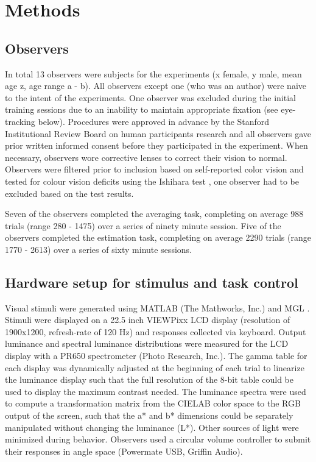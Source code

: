 \section{Methods}

\subsection{Observers}
In total 13 observers were subjects for the experiments (x female, y male, mean age z, age range a - b). All observers except one (who was an author) were naive to the intent of the experiments. One observer was excluded during the initial training sessions due to an inability to maintain appropriate fixation (see eye-tracking below). Procedures were approved in advance by the Stanford Institutional Review Board on human participants research and all observers gave prior written informed consent before they participated in the experiment. When necessary, observers wore corrective lenses to correct their vision to normal. Observers were filtered prior to inclusion based on self-reported color vision and tested for colour vision deficits using the Ishihara test \citep{Ishihara1987-wo}, one observer had to be excluded based on the test results.

Seven of the observers completed the averaging task, completing on average 988 trials (range 280 - 1475) over a series of ninety minute session. Five of the observers completed the estimation task, completing on average 2290 trials (range 1770 - 2613) over a series of sixty minute sessions. 

\subsection{Hardware setup for stimulus and task control}

Visual stimuli were generated using MATLAB (The Mathworks, Inc.) and MGL \citep{Gardner2018-uq}. Stimuli were displayed on a 22.5 inch VIEWPixx LCD display (resolution of 1900x1200, refresh-rate of 120 Hz) and responses collected via keyboard. Output luminance and spectral luminance distributions were measured for the LCD display with a PR650 spectrometer (Photo Research, Inc.). The gamma table for each display was dynamically adjusted at the beginning of each trial to linearize the luminance display such that the full resolution of the 8-bit table could be used to display the maximum contrast needed. The luminance spectra were used to compute a transformation matrix from the CIELAB color space to the RGB output of the screen, such that the a* and b* dimensions could be separately manipulated without changing the luminance (L*). Other sources of light were minimized during behavior. Observers used a circular volume controller to submit their responses in angle space (Powermate USB, Griffin Audio).

